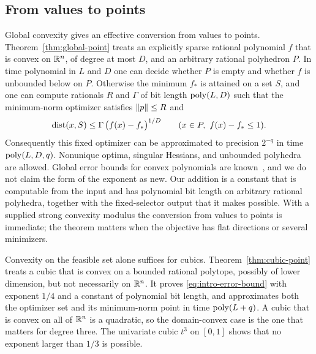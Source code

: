 \subsection{From values to points}
\label{sec:intro-points}

Global convexity gives an effective conversion from values to points.
Theorem~\ref{thm:global-point} treats an explicitly sparse rational
polynomial $f$ that is convex on $\mathbb R^n$, of degree at most $D$, and an
arbitrary rational polyhedron $P$. In time polynomial in $L$ and $D$ one can
decide whether $P$ is empty and whether $f$ is unbounded below on $P$.
Otherwise the minimum $f_*$ is attained on a set $S$, and one can compute
rationals $R$ and $\Gamma$ of bit length $\operatorname{poly}(L,D)$ such that the
minimum-norm optimizer satisfies $\left\lVert p\right\rVert\le R$ and
\begin{equation}
\label{eq:intro-error-bound}
\operatorname{dist}(x,S)\le\Gamma\,\bigl(f(x)-f_*\bigr)^{1/D}
\qquad(x\in P,\ f(x)-f_*\le1).
\end{equation}
Consequently this fixed optimizer can be approximated to precision $2^{-q}$
in time $\operatorname{poly}(L,D,q)$. Nonunique optima, singular Hessians, and unbounded
polyhedra are allowed. Global error bounds for convex polynomials are
known~\cite{Li2010,Li2013,Yang2009,Ngai2015}, and we do not claim the form of
the exponent as new. Our addition is a constant that is computable from the
input and has polynomial bit length on arbitrary rational polyhedra,
together with the fixed-selector output that it makes possible. With a
supplied strong convexity modulus the conversion from values to points is
immediate; the theorem matters when the objective has flat directions or
several minimizers.

Convexity on the feasible set alone suffices for cubics.
Theorem~\ref{thm:cubic-point} treats a cubic that is convex on a bounded
rational polytope, possibly of lower dimension, but not necessarily on
$\mathbb R^n$. It proves \eqref{eq:intro-error-bound} with exponent $1/4$ and a
constant of polynomial bit length, and approximates both the optimizer set
and its minimum-norm point in time $\operatorname{poly}(L+q)$. A cubic that is convex on all
of $\mathbb R^n$ is a quadratic, so the domain-convex case is the one that matters
for degree three. The univariate cubic $t^3$ on $[0,1]$ shows that no exponent
larger than $1/3$ is possible.

